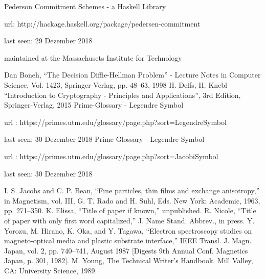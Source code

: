 \begin{thebibliography}{00}
	 Pederson Commitment Schemes - a Haskell Library 
	
	url: http://hackage.haskell.org/package/pedersen-commitment 
	
	last seen: 29 Dezember 2018 
	
	maintained at the Massachusets Institute for Technology
	
	 Dan Boneh, ``The Decision Diffie-Hellman Problem'' - Lecture Notes in Computer Science, Vol. 1423, Springer-Verlag, pp. 48--63, 1998 
	 H. Delfs, H. Knebl ``Introduction to Cryptography - Principles and Applications'', 3rd Edition, Springer-Verlag, 2015
	 Prime-Glossary - Legendre Symbol

	url : https://primes.utm.edu/glossary/page.php?sort=LegendreSymbol
	
	last seen: 30 Dezember 2018
	 Prime-Glossary - Legendre Symbol
	
	url : https://primes.utm.edu/glossary/page.php?sort=JacobiSymbol
	
	last seen: 30 Dezember 2018

 I. S. Jacobs and C. P. Bean, ``Fine particles, thin films and exchange anisotropy,'' in Magnetism, vol. III, G. T. Rado and H. Suhl, Eds. New York: Academic, 1963, pp. 271--350.
 K. Elissa, ``Title of paper if known,'' unpublished.
 R. Nicole, ``Title of paper with only first word capitalized,'' J. Name Stand. Abbrev., in press.
 Y. Yorozu, M. Hirano, K. Oka, and Y. Tagawa, ``Electron spectroscopy studies on magneto-optical media and plastic substrate interface,'' IEEE Transl. J. Magn. Japan, vol. 2, pp. 740--741, August 1987 [Digests 9th Annual Conf. Magnetics Japan, p. 301, 1982].
 M. Young, The Technical Writer's Handbook. Mill Valley, CA: University Science, 1989.
\end{thebibliography}
\vspace{12pt}